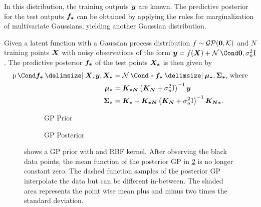 In this distribution, the training outputs $\bm{y}$ are known.
The predictive posterior for the test outputs $\bm{f_\ast}$ can be obtained by applying the rules for marginalization of multivariate Gaussians, yielding another Gaussian distribution.
\begin{lemma}
    \label{lem:gp_posterior}
    Given a latent function with a Gaussian process distribution $f \sim \operatorname{\mathcal{GP}}(\bm{0}, \operatorname{\mathcal{K}})$ and $N$ training points $\bm{X}$ with noisy observations of the form $\mat{y} = f(\mat{X}) + \Gaussian{\mat{0}, \sigma_n^2 \Eye}$.
    The predictive posterior $\bm{f_\ast}$ of the test points $\bm{X_\ast}$ is then given by
    \begin{align}
        \begin{split}
            \Prob{\mat{f_\ast} \given \mat{X}, \mat{y}, \mat{X_\ast}} &= \Gaussian*{\mat{f_\ast} \given \mat{\mu_\ast}, \mat{\Sigma_\ast}} \text{, where} \\
            \mat{\mu_\ast} &= \mat{K_{\ast N}} \left( \mat{K_N} + \sigma_n^2 \Eye \right)^{-1} \mat{y} \\
            \mat{\Sigma_\ast} &= \mat{K_\ast} - \mat{K_{\ast N}} \left( \mat{K_N} + \sigma_n^2 \Eye \right)^{-1} \mat{K_{N\ast}}.
        \end{split}
    \end{align}
\end{lemma}
\begin{figure}[tb]
    \centering
    \begin{subfigure}{\subfigurewidth}
        \centering
        \caption{GP Prior}
        \label{fig:gp_posterior:prior}
    \end{subfigure}
    \begin{subfigure}{\subfigurewidth}
        \centering
        \caption{GP Posterior}
        \label{fig:gp_posterior:posterior}
    \end{subfigure}
    \caption[GP posterior]{
         shows a GP prior with and RBF kernel.
        After observing the black data points, the mean function of the posterior GP in \cref{fig:gp_posterior:posterior} is no longer constant zero.
        The dashed function samples of the posterior GP interpolate the data but can be different in-between.
        The shaded area represents the point wise mean plus and minus two times the standard deviation.
    }
    \label{fig:gp_posterior}
\end{figure}


